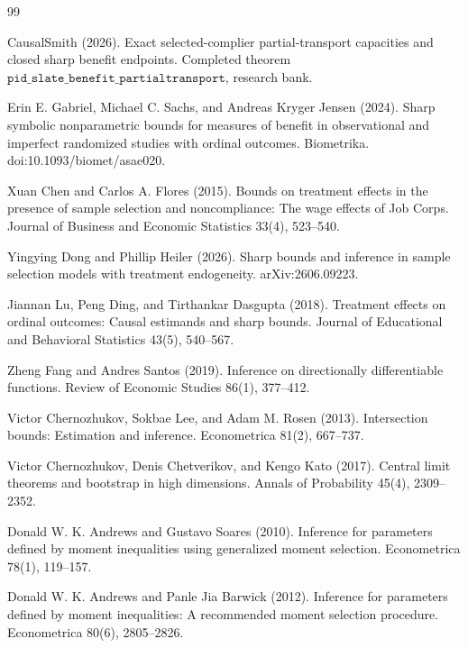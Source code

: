 \documentclass{article}
\begin{document}
\begin{thebibliography}{99}

   CausalSmith (2026). Exact selected-complier partial-transport capacities and closed sharp benefit endpoints. Completed theorem \(\texttt{pid\_slate\_benefit\_partialtransport}\), research bank.

   Erin E. Gabriel, Michael C. Sachs, and Andreas Kryger Jensen (2024). Sharp symbolic nonparametric bounds for measures of benefit in observational and imperfect randomized studies with ordinal outcomes. Biometrika. doi:10.1093/biomet/asae020.

   Xuan Chen and Carlos A. Flores (2015). Bounds on treatment effects in the presence of sample selection and noncompliance: The wage effects of Job Corps. Journal of Business and Economic Statistics 33(4), 523--540.

   Yingying Dong and Phillip Heiler (2026). Sharp bounds and inference in sample selection models with treatment endogeneity. arXiv:2606.09223.

   Jiannan Lu, Peng Ding, and Tirthankar Dasgupta (2018). Treatment effects on ordinal outcomes: Causal estimands and sharp bounds. Journal of Educational and Behavioral Statistics 43(5), 540--567.

   Zheng Fang and Andres Santos (2019). Inference on directionally differentiable functions. Review of Economic Studies 86(1), 377--412.

   Victor Chernozhukov, Sokbae Lee, and Adam M. Rosen (2013). Intersection bounds: Estimation and inference. Econometrica 81(2), 667--737.

   Victor Chernozhukov, Denis Chetverikov, and Kengo Kato (2017). Central limit theorems and bootstrap in high dimensions. Annals of Probability 45(4), 2309--2352.

   Donald W. K. Andrews and Gustavo Soares (2010). Inference for parameters defined by moment inequalities using generalized moment selection. Econometrica 78(1), 119--157.

   Donald W. K. Andrews and Panle Jia Barwick (2012). Inference for parameters defined by moment inequalities: A recommended moment selection procedure. Econometrica 80(6), 2805--2826.


\end{thebibliography}
\end{document}
